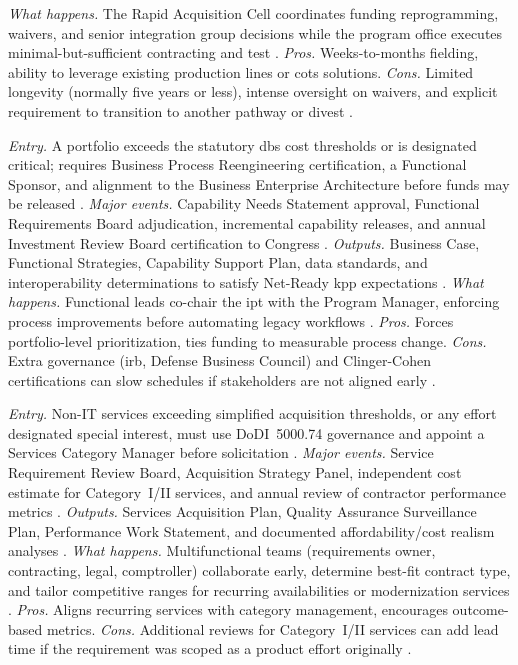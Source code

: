 \documentclass[../main.tex]{subfiles}
\begin{document}
\begin{description}[style=nextline,labelsep=0.5em,font=\bfseries]
        \textit{What happens.} The Rapid Acquisition Cell coordinates funding reprogramming, waivers, and senior integration group decisions while the program office executes minimal-but-sufficient contracting and test \autocite{DoDI5000-81}.
        \textit{Pros.} Weeks-to-months fielding, ability to leverage existing production lines or \ac{cots} solutions.
        \textit{Cons.} Limited longevity (normally five years or less), intense oversight on waivers, and explicit requirement to transition to another pathway or divest \autocite{DoDI5000-81}.
  \item[Defense Business Systems.]
        \textit{Entry.} A portfolio exceeds the statutory \ac{dbs} cost thresholds or is designated critical; requires Business Process Reengineering certification, a Functional Sponsor, and alignment to the Business Enterprise Architecture before funds may be released \autocite{DoDI5000-75}.
        \textit{Major events.} Capability Needs Statement approval, Functional Requirements Board adjudication, incremental capability releases, and annual Investment Review Board certification to Congress \autocite{DoDI5000-75}.
        \textit{Outputs.} Business Case, Functional Strategies, Capability Support Plan, data standards, and interoperability determinations to satisfy Net-Ready \ac{kpp} expectations \autocite{DoDI5000-75}.
        \textit{What happens.} Functional leads co-chair the \ac{ipt} with the Program Manager, enforcing process improvements before automating legacy workflows \autocite{DoDI5000-75}.
        \textit{Pros.} Forces portfolio-level prioritization, ties funding to measurable process change.
        \textit{Cons.} Extra governance (\ac{irb}, Defense Business Council) and Clinger-Cohen certifications can slow schedules if stakeholders are not aligned early \autocite{DoDI5000-75}.
  \item[Defense Acquisition of Services.]
        \textit{Entry.} Non-IT services exceeding simplified acquisition thresholds, or any effort designated special interest, must use DoDI~5000.74 governance and appoint a Services Category Manager before solicitation \autocite{DoDI5000-74}.
        \textit{Major events.} Service Requirement Review Board, Acquisition Strategy Panel, independent cost estimate for Category~I/II services, and annual review of contractor performance metrics \autocite{DoDI5000-74}.
        \textit{Outputs.} Services Acquisition Plan, Quality Assurance Surveillance Plan, Performance Work Statement, and documented affordability/cost realism analyses \autocite{DoDI5000-74}.
        \textit{What happens.} Multifunctional teams (requirements owner, contracting, legal, comptroller) collaborate early, determine best-fit contract type, and tailor competitive ranges for recurring availabilities or modernization services \autocite{DoDI5000-74}.
        \textit{Pros.} Aligns recurring services with category management, encourages outcome-based metrics.
        \textit{Cons.} Additional reviews for Category~I/II services can add lead time if the requirement was scoped as a product effort originally \autocite{DoDI5000-74}.
\end{description}
\end{document}
